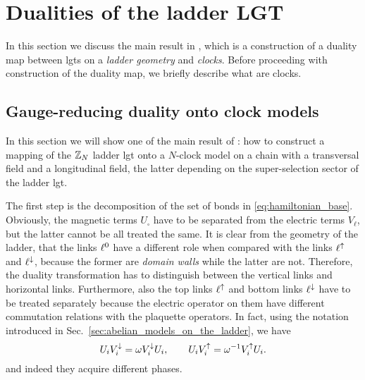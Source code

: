 \section{Dualities of the ladder LGT}%
\label{sec:dualities_of_the_ladder}

In this section we discuss the main result in \cite{pradhan2022ladder}, which is a construction of a duality map between \acp{lgt} on a \emph{ladder geometry} and \emph{\aclp{clock}}.
Before proceeding with construction of the duality map, we briefly describe what are \acp{clock}.


%
%



\subsection{Gauge-reducing duality onto clock models}
\label{sub:duality_onto_clock_models}

In this section we will show one of the main result of \cite{pradhan2022ladder}: how to construct a mapping of the $\mathbb{Z}_N$ ladder \ac{lgt} onto a $N$-clock model on a chain with a transversal field and a longitudinal field, the latter depending on the super-selection sector of the ladder \ac{lgt}.

The first step is the decomposition of the set of bonds in \eqref{eq:hamiltonian_base}.
Obviously, the magnetic terms $U_{\square}$ have to be separated from the electric terms $V_\ell$, but the latter cannot be all treated the same.
It is clear from the geometry of the ladder, that the links $\ell^0$ have a different role when compared with the links $\ell^\uparrow$ and $\ell^\downarrow$, because the former are \emph{domain walls} while the latter are not.
Therefore, the duality transformation has to distinguish between the vertical links and horizontal links.
Furthermore, also the top links $\ell^\uparrow$ and bottom links $\ell^\downarrow$ have to be treated separately because the electric operator on them have different commutation relations with the plaquette operators.
In fact, using the notation introduced in Sec.~\ref{sec:abelian_models_on_the_ladder}, we have
\begin{equation}
    U_i V^{\downarrow}_i = \omega V^{\downarrow}_i U_i, \qquad
    U_i V^{\uparrow}_i = \omega^{-1} V^{\uparrow}_i U_i.
    \label{eq:comm_rel_ladder}
\end{equation}
and indeed they acquire different phases.

